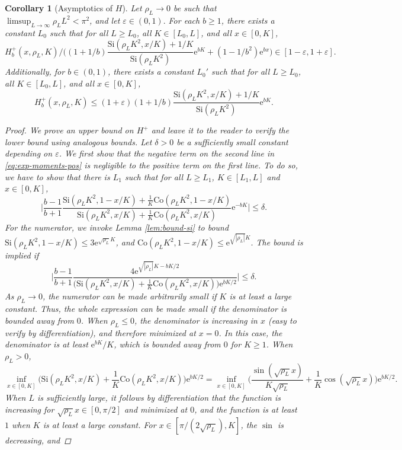 \documentclass[a4paper, a4wide, 10pt, reqno]{amsart}
\theoremstyle{plain}
\newtheorem{corollary}[theorem]{Corollary}
\theoremstyle{definition}
\numberwithin{equation}{section}
\newcommand{\re}{{\mathrm e}}
\newcommand{\Co}{{\mathrm{Co}}}
\newcommand{\Si}{{\mathrm{Si}}}
\begin{document}
\pagebreak[3]
    
\begin{corollary}[Asymptotics of $H$]\label{cor:hb-asymp}
    Let $\rho_L\to0$ be such that $\limsup_{L\to\infty}\rho_L L^2<\pi^2$, and let $\varepsilon\in(0,1).$ For each $b\ge 1$, there exists a constant $L_0$ such that for all $L\ge L_0$, all $K\in[L_0,L]$, and all $x\in[0,K]$, 
    \[
    H_b^+(x, \rho_L, K)\bigg/\bigg((1+1/b)\frac{\Si(\rho_L K^2, x/K)+1/K}{\Si(\rho_L K^2)}\re^{bK} +(1-1/b^2)\re^{bx}\bigg) \in[1-\varepsilon, 1+\varepsilon].
    \]
    Additionally, for $b\in(0,1)$, there exists a constant $L_0'$ such that for all $L\ge L_0$, all $K\in[L_0,L]$, and all $x\in[0,K]$, 
    \[
    H_b^+(x, \rho_L, K)\le (1+\varepsilon)(1+1/b)\frac{\Si(\rho_L K^2, x/K)+1/K}{\Si(\rho_L K^2)}\re^{bK}.
    \]
    \begin{proof}
        We prove an upper bound on $H^+$ and leave it to the reader to verify the lower bound using analogous bounds. Let $\delta>0$ be a sufficiently small constant depending on $\varepsilon$. We first show that the negative term on the second line in \eqref{eq:exp-moments-pos} is negligible to the positive term on the first line. To do so, we have to show that there is $L_1$ such that for all $L\ge L_1$, $K\in[L_1, L]$ and $x\in[0, K]$,
        \[
        \bigg|\frac{b-1}{b+1}\frac{\Si(\rho_L K^2, 1-x/K) + \frac{1}{K}\Co(\rho_LK^2, 1-x/K)}{\Si(\rho_L K^2, x/K) + \frac{1}{K}\Co(\rho_LK^2, x/K)}\re^{-bK}\bigg| \le \delta.
        \]
        For the numerator, we invoke Lemma \ref{lem:bound-si} to bound $\Si(\rho_LK^2, 1-x/K)\le 3\re^{\sqrt{\rho_L}K}$, and $\Co(\rho_LK^2, 1-x/K)\le \re^{\sqrt{|\rho_L|}K}$. 
        The bound is implied if 
        \[
        \bigg|\frac{b-1}{b+1}\frac{4\re^{\sqrt{|\rho_L|}K-bK/2}}{\big(\Si(\rho_L K^2, x/K) + \frac{1}{K}\Co(\rho_LK^2, x/K)\big)\re^{bK/2}}\bigg| \le \delta.
        \]
        As $\rho_L\to 0$, the numerator can be made arbitrarily small if $K$ is at least a large constant. Thus, the whole expression can be made small if the denominator is bounded away from $0$. When $\rho_L\le 0$, the denominator is increasing in $x$ (easy to verify by differentiation), and therefore minimized at $x=0$. In this case, the denominator is at least $\re^{bK}/K$, which is bounded away from $0$ for $K\ge 1$. When $\rho_L>0$,
        \[
        \inf_{x\in[0, K]}\Big(\Si(\rho_L K^2, x/K) + \frac{1}{K}\Co(\rho_LK^2, x/K)\Big)\re^{bK/2} = \inf_{x\in[0, K]}\Big(\frac{\sin(\sqrt{\rho_L}x)}{K\sqrt{\rho_L}} + \frac{1}{K}\cos(\sqrt{\rho_L}x)\Big)\re^{bK/2}.
        \]
        When $L$ is sufficiently large, it follows by differentiation that the function is increasing for $\sqrt{\rho_L}x\in[0, \pi/2]$ and minimized at $0$, and the function  is at least $1$ when $K$ is at least a large constant. For $x\in[\pi/(2\sqrt{\rho_L}), K]$, the $\sin$ is decreasing, and 

\end{proof}
\end{corollary}
\end{document}
